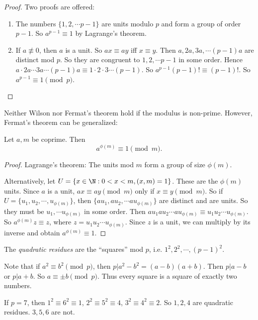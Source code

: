 \documentclass[a4paper]{article}
\begin{document}
  \begin{proof}
    Two proofs are offered:
    \begin{enumerate}
      \item The numbers $\{1, 2, \cdots p - 1\}$ are units modulo $p$ and form a group of order $p - 1$. So $a^{p - 1} \equiv 1$ by Lagrange's theorem.
      \item If $a\not\equiv 0$, then $a$ is a unit. So $ax \equiv ay$ iff $x\equiv y$. Then $a, 2a, 3a, \cdots (p - 1)a$ are distinct mod $p$. So they are congruent to $1, 2, \cdots p -1$ in some order. Hence $a\cdot 2a\cdots 3a\cdots (p - 1)a\equiv 1\cdot 2\cdot 3 \cdots (p - 1)$. So $a^{p - 1}(p - 1)! \equiv (p - 1)!$. So $a^{p - 1} \equiv 1\pmod p$.
    \end{enumerate}
  \end{proof}
  \note Neither Wilson nor Fermat's theorem hold if the modulus is non-prime. However, Fermat's theorem can be generalized:
  \begin{thm}
    Let $a, m$ be coprime. Then 
    \[
      a^{\phi(m)} \equiv 1\pmod m.
    \]
  \end{thm}

  \begin{proof}
    Lagrange's theorem: The units mod $m$ form a group of size $\phi(m)$.

    Alternatively, let $U = \{x\in \N: 0 < x < m, (x, m) = 1\}$. These are the $\phi(m)$ units. Since $a$ is a unit, $ax\equiv ay \pmod m$ only if $x\equiv y\pmod m$. So if $U = \{u_1, u_2, \cdots , u_{\phi(m)}\}$, then $\{au_1, au_2, \cdots au_{\phi(m)}\}$ are distinct and are units. So they must be $u_1, \cdots u_{\phi(m)}$ in some order. Then $au_1au_2\cdots au_{\phi(m)} \equiv u_1u_2\cdots u_{\phi(m)}$. So $a^{\phi(m)}z \equiv z$, where $z = u_1u_2\cdots u_{\phi(m)}$. Since $z$ is a unit, we can multiply by its inverse and obtain $a^{\phi(m)} \equiv 1$.
  \end{proof}

  \begin{defi}
    The \emph{quadratic residues} are the ``squares'' mod $p$, i.e. $1^2, 2^2, \cdots, (p - 1)^2$.
  \end{defi}

  Note that if $a^2 \equiv b^2\pmod p$, then $p | a^2 - b^2 = (a - b)(a + b)$. Then $p | a - b$ or $p | a + b$. So $a\equiv \pm b\pmod p$. Thus every square is a square of exactly two numbers.

  \begin{eg}
    If $p = 7$, then $1^2 \equiv 6^2 \equiv 1$, $2^2 \equiv 5^2 \equiv 4$, $3^2 \equiv 4^2 \equiv 2$. So $1, 2, 4$ are quadratic residues. $3, 5, 6$ are not.
  \end{eg}
\end{document}
